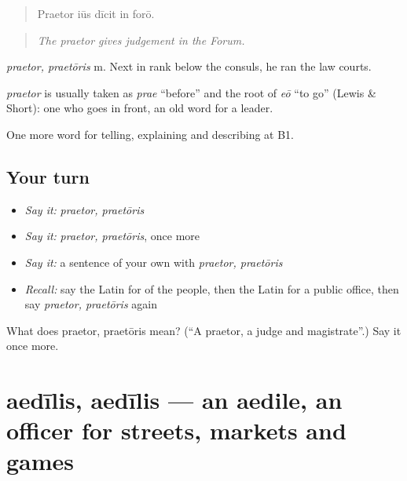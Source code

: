 \begin{quote}
Praetor iūs dīcit in forō.
\end{quote}

\begin{quote}
\emph{The praetor gives judgement in the Forum.}
\end{quote}

\emph{praetor, praetōris} m. Next in rank below the consuls, he ran the law courts.

\begin{cousinweb}
\emph{praetor} is usually taken as \emph{prae} \textquotedblleft{}before\textquotedblright{} and the root of \emph{eō} \textquotedblleft{}to go\textquotedblright{} (Lewis \& Short): one who goes in front, an old word for a leader.
\end{cousinweb}

\begin{grammarlens}[title={What you've built}]
One more word for telling, explaining and describing at B1.
\end{grammarlens}

\subsection*{Your turn}
\begin{itemize}
\raggedright
  \item \emph{Say it:} \emph{praetor, praetōris}
  \item \emph{Say it:} \emph{praetor, praetōris}, once more
  \item \emph{Say it:} a sentence of your own with \emph{praetor, praetōris}
  \item \emph{Recall:} say the Latin for of the people, then the Latin for a public office, then say \emph{praetor, praetōris} again
\end{itemize}

\begin{tcolorbox}[breakable,colback=teal!4,colframe=teal!35!black,title={Before you move on}]
What does praetor, praetōris mean? (\textquotedblleft{}A praetor, a judge and magistrate\textquotedblright{}.) Say it once more.
\end{tcolorbox}
\section[aedīlis, aedīlis]{aedīlis, aedīlis — an aedile, an officer for streets, markets and games}

\label{lesson:LA-C383-aedilis}



